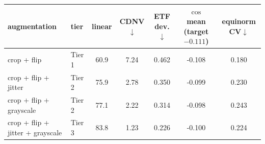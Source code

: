 \begin{tabular}{l l ccccc}
\toprule
augmentation & tier & linear & CDNV$\downarrow$ & ETF dev.$\downarrow$ & $\cos$ mean (target $-0.111$) & equinorm CV$\downarrow$ \\
\midrule
crop + flip & Tier 1 & 60.9 & 7.24 & 0.462 & -0.108 & 0.180 \\
crop + flip + jitter & Tier 2 & 75.9 & 2.78 & 0.350 & -0.099 & 0.230 \\
crop + flip + grayscale & Tier 2 & 77.1 & 2.22 & 0.314 & -0.098 & 0.243 \\
crop + flip + jitter + grayscale & Tier 3 & 83.8 & 1.23 & 0.226 & -0.100 & 0.224 \\
\bottomrule
\end{tabular}
